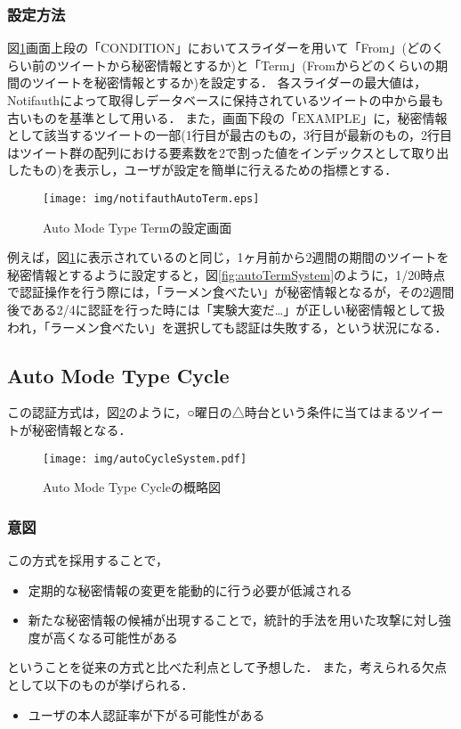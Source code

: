\subsubsection{設定方法}
図\ref{fig:notifauthAutoTerm}画面上段の「CONDITION」においてスライダーを用いて「From」(どのくらい前のツイートから秘密情報とするか)と「Term」(Fromからどのくらいの期間のツイートを秘密情報とするか)を設定する．
各スライダーの最大値は，Notifauthによって取得しデータベースに保持されているツイートの中から最も古いものを基準として用いる．
また，画面下段の「EXAMPLE」に，秘密情報として該当するツイートの一部(1行目が最古のもの，3行目が最新のもの，2行目はツイート群の配列における要素数を2で割った値をインデックスとして取り出したもの)を表示し，ユーザが設定を簡単に行えるための指標とする．

\begin{figure}[ht]
  \begin{center}
    \texttt{[image: img/notifauthAutoTerm.eps]}
  \end{center}
  \caption{Auto Mode Type Termの設定画面}
  \label{fig:notifauthAutoTerm}
\end{figure}

例えば，図\ref{fig:notifauthAutoTerm}に表示されているのと同じ，1ヶ月前から2週間の期間のツイートを秘密情報とするように設定すると，図\ref{fig:autoTermSystem}のように，1/20時点で認証操作を行う際には，「ラーメン食べたい」が秘密情報となるが，その2週間後である2/4に認証を行った時には「実験大変だ…」が正しい秘密情報として扱われ，「ラーメン食べたい」を選択しても認証は失敗する，という状況になる．

\subsection{Auto Mode Type Cycle}
この認証方式は，図\ref{fig:autoCycleSystem}のように，○曜日の△時台という条件に当てはまるツイートが秘密情報となる．

\begin{figure}[ht]
  \begin{center}
    \texttt{[image: img/autoCycleSystem.pdf]}
  \end{center}
  \caption{Auto Mode Type Cycleの概略図}
  \label{fig:autoCycleSystem}
\end{figure}

\subsubsection{意図}
この方式を採用することで，
\begin{itemize}
  \item 定期的な秘密情報の変更を能動的に行う必要が低減される
  \item 新たな秘密情報の候補が出現することで，統計的手法を用いた攻撃に対し強度が高くなる可能性がある
\end{itemize}
ということを従来の方式と比べた利点として予想した．
また，考えられる欠点として以下のものが挙げられる．
\begin{itemize}
  \item ユーザの本人認証率が下がる可能性がある
\end{itemize}

